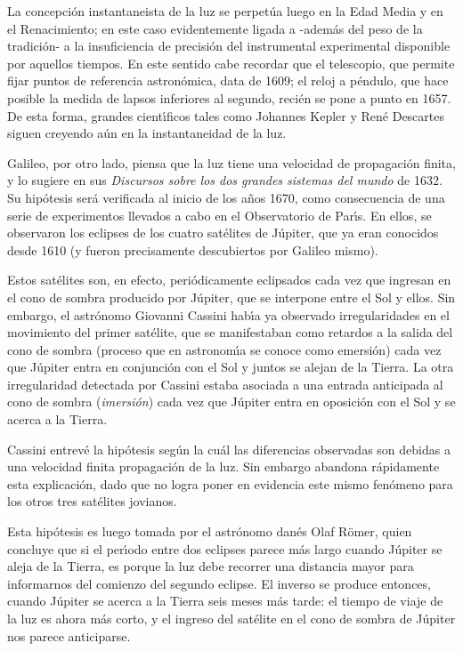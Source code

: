 \documentclass{article}
\begin{document}
La concepci\'on instantaneista de la luz se perpet\'ua luego en la Edad Media
y en el Renacimiento; en este caso evidentemente ligada a -adem\'as del peso
de la tradici\'on- a la insuficiencia de precisi\'on del instrumental 
experimental disponible por aquellos tiempos. En este sentido cabe recordar
que el telescopio, que permite fijar puntos de referencia astron\'omica, data
de 1609; el reloj a p\'endulo, que hace posible la medida de lapsos inferiores
al segundo, reci\'en se pone a punto en 1657. De esta forma, grandes 
cient\'\i ficos tales como Johannes Kepler y Ren\'e Descartes siguen creyendo
a\'un en la instantaneidad de la luz.

Galileo, por otro lado, piensa que la luz tiene una velocidad de propagaci\'on
finita, y lo sugiere en sus {\it Discursos sobre los dos grandes sistemas
del mundo} de 1632. Su hip\'otesis ser\'a verificada al inicio de los a\~nos
1670, como consecuencia de una serie de experimentos llevados a cabo en el
Observatorio de Par\'\i s. En ellos, se observaron los eclipses de los cuatro
sat\'elites de J\'upiter, que ya eran conocidos desde 1610 (y fueron 
precisamente descubiertos por Galileo mismo).

Estos sat\'elites son, en efecto, peri\'odicamente eclipsados cada vez que
ingresan en el cono de sombra producido por J\'upiter, que se interpone entre
el Sol y ellos. Sin embargo, el astr\'onomo Giovanni Cassini hab\'\i a ya
observado irregularidades en el movimiento del primer sat\'elite, que se
manifestaban como retardos a la salida del cono de sombra (proceso que en
astronom\'\i a se conoce como {emersi\'on}) cada vez que J\'upiter entra en
conjunci\'on con el Sol y juntos se alejan de la Tierra. La otra irregularidad
detectada por Cassini estaba asociada a una entrada anticipada al cono de 
sombra ({\it imersi\'on}) cada vez que J\'upiter entra en oposici\'on con
el Sol y se acerca a la Tierra.

Cassini entrev\'e la hip\'otesis seg\'un la cu\'al las diferencias observadas
son debidas a una velocidad finita propagaci\'on de la luz. Sin embargo 
abandona r\'apidamente esta explicaci\'on, dado que no logra poner en 
evidencia este mismo fen\'omeno para los otros tres sat\'elites jovianos.

Esta hip\'otesis es luego tomada por el astr\'onomo dan\'es Olaf R\"omer,
quien concluye que si el per\'\i odo entre dos eclipses parece m\'as largo
cuando J\'upiter se aleja de la Tierra, es porque la luz debe recorrer una
distancia mayor para informarnos del comienzo del segundo eclipse. El inverso
se produce entonces, cuando J\'upiter se acerca a la Tierra seis meses m\'as
tarde: el tiempo de viaje de la luz es ahora m\'as corto, y el ingreso del
sat\'elite en el cono de sombra de J\'upiter nos parece anticiparse.
\end{document}
